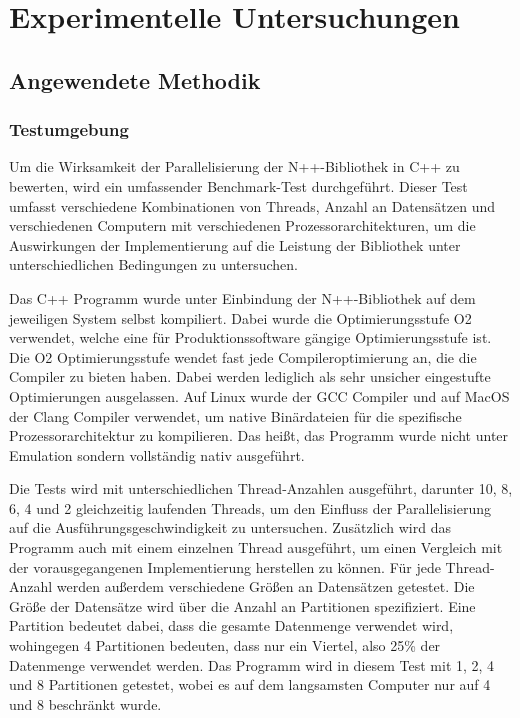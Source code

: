\chapter{Experimentelle Untersuchungen}
\label{ch:EntwickelteMethode}

\section{Angewendete Methodik}
\subsection{Testumgebung}

Um die Wirksamkeit der Parallelisierung der N++-Bibliothek in C++ zu bewerten, wird ein umfassender Benchmark-Test durchgeführt. Dieser Test umfasst verschiedene Kombinationen von Threads, Anzahl an Datensätzen und verschiedenen Computern mit verschiedenen Prozessorarchitekturen, um die Auswirkungen der Implementierung auf die Leistung der Bibliothek unter unterschiedlichen Bedingungen zu untersuchen.

Das C++ Programm wurde unter Einbindung der N++-Bibliothek auf dem jeweiligen System selbst kompiliert. Dabei wurde die Optimierungsstufe O2 verwendet, welche eine für Produktionssoftware gängige Optimierungsstufe ist. Die O2 Optimierungsstufe wendet fast jede Compileroptimierung an, die die Compiler zu bieten haben. Dabei werden lediglich als sehr unsicher eingestufte Optimierungen ausgelassen. Auf Linux wurde der GCC Compiler und auf MacOS der Clang Compiler verwendet, um native Binärdateien für die spezifische Prozessorarchitektur zu kompilieren. Das heißt, das Programm wurde nicht unter Emulation sondern vollständig nativ ausgeführt.

Die Tests wird mit unterschiedlichen Thread-Anzahlen ausgeführt, darunter 10, 8, 6, 4 und 2 gleichzeitig laufenden Threads, um den Einfluss der Parallelisierung auf die Ausführungsgeschwindigkeit zu untersuchen. Zusätzlich wird das Programm auch mit einem einzelnen Thread ausgeführt, um einen Vergleich mit der vorausgegangenen Implementierung herstellen zu können. Für jede Thread-Anzahl werden außerdem verschiedene Größen an Datensätzen getestet. Die Größe der Datensätze wird über die Anzahl an Partitionen spezifiziert. Eine Partition bedeutet dabei, dass die gesamte Datenmenge verwendet wird, wohingegen 4 Partitionen bedeuten, dass nur ein Viertel, also 25\% der Datenmenge verwendet werden. Das Programm wird in diesem Test mit 1, 2, 4 und 8 Partitionen getestet, wobei es auf dem langsamsten Computer nur auf 4 und 8 beschränkt wurde.

